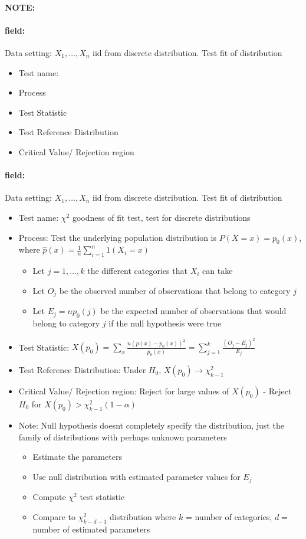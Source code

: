 \documentclass[12pt]{article}
\newenvironment{note}{\paragraph{NOTE:}}{}
\newenvironment{field}{\paragraph{field:}}{}
\begin{document}
\begin{note}
  \begin{field}
    Data setting: $X_1, \ldots , X_n$ iid from discrete distribution. Test fit of distribution
    \begin{itemize}
      \item Test name:
      \item Process
      \item Test Statistic
      \item Test Reference Distribution
      \item Critical Value/ Rejection region
    \end{itemize}
  \end{field}
  \begin{field}
    Data setting: $X_1, \ldots , X_n$ iid from discrete distribution. Test fit of distribution
    \begin{itemize}
      \item Test name: $\chi^2$ goodness of fit test, test for discrete distributions
      \item Process: Test the underlying population distribution is $P(X = x) = p_0(x)$, where $\hat{p}(x) = \frac{1}{n} \sum_{i=1}^n 1(X_i = x)$
      \begin{itemize}
        \item Let $j = 1, \ldots, k$ the different categories that $X_i$ can take
        \item Let $O_j$ be the observed number of observations that belong to category $j$
        \item Let $E_j = np_0(j)$ be the expected number of observations that would belong to category $j$ if the null hypothesis were true
      \end{itemize}
      \item Test Statistic: $X(p_0) = \sum_x\frac{n(\hat{p}(x) - p_0(x))^2}{p_0(x)} = \sum_{j=1}^k \frac{(O_j - E_j)^2}{E_j}$
      \item Test Reference Distribution: Under $H_0$, $X(p_0) \to \chi_{k-1}^2$
      \item Critical Value/ Rejection region: Reject for large values of $X(p_0)$ - Reject $H_0$ for $X(p_0) > \chi_{k-1}^2(1-\alpha)$
      \item Note: Null hypothesis doesnt completely specify the distribution, just the family of distributions with perhaps unknown parameters
      \begin{itemize}
        \item Estimate the parameters
        \item Use null distribution with estimated parameter values for $E_j$
        \item Compute $\chi^2$ test statistic
        \item Compare to $\chi_{k-d-1}^2$ distribution where $k$ = number of categories, $d = $ number of estimated parameters
      \end{itemize}
    \end{itemize}
  \end{field}
\end{note}
\end{document}
